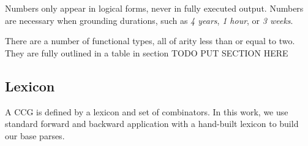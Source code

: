 \begin{definition}[Number]
Numbers only appear in logical forms, never in fully executed output. Numbers are necessary when grounding durations, such as \emph{4 years}, \emph{1 hour}, or \emph{3 weeks}. 
\end{definition}

\begin{definition}
There are a number of functional types, all of arity less than or equal to two. They are fully outlined in a table in section TODO PUT SECTION HERE
\end{definition}

\subsection{Lexicon}
A CCG is defined by a lexicon and set of combinators. In this work, we use standard forward and backward application with a hand-built lexicon to build our base parses. 

